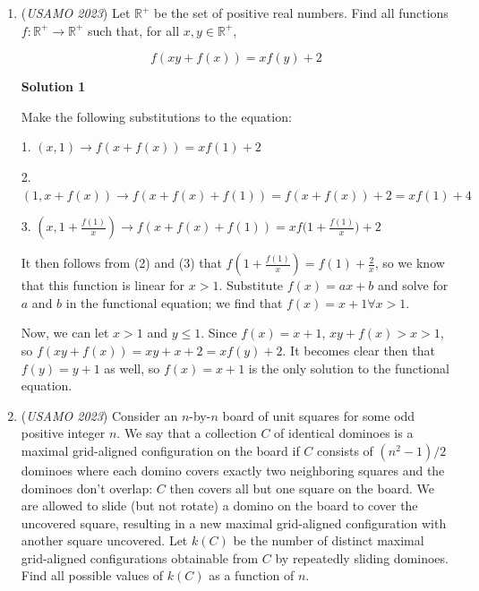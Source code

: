 \begin{enumerate}
\textbf{Solution 3}

Let $X$ be the foot from $A$ to $BC.$ Note that $\angle AXC=\angle APC,$ so $(AXPC)$ is cyclic. Furthermore, $AP$ is the radical axis of $(ABP)$ and $(AXPC),$ so since $M$ lies on $AP,$ we must have that $BM\cdot MQ=CM\cdot MX,$ so $M$ is the midpoint of $QX.$ Therefore, $MN\parallel AX\perp BC,$ so we are done. ~krithikrokcs

 


	\item (\textit{USAMO 2023}) Let $\mathbb{R}^{+}$ be the set of positive real numbers. Find all functions $f:\mathbb{R}^{+}\rightarrow\mathbb{R}^{+}$ such that, for all $x, y \in \mathbb{R}^{+}$,

 \[f(xy + f(x)) = xf(y) + 2\]




\textbf{Solution 1}

Make the following substitutions to the equation:

 1. $(x, 1) \rightarrow f(x + f(x)) = xf(1) + 2$

 2. $(1, x + f(x)) \rightarrow f(x + f(x) + f(1)) = f(x + f(x)) + 2 = xf(1) + 4$

 3. $(x, 1 + \frac{f(1)}{x}) \rightarrow f(x + f(x) + f(1)) = xf\biggl(1 + \frac{f(1)}{x}\biggr) + 2$

 It then follows from (2) and (3) that $f(1 + \frac{f(1)}{x}) = f(1) + \frac{2}{x}$, so we know that this function is linear for $x > 1$. Substitute $f(x) = ax+b$ and solve for $a$ and $b$ in the functional equation; we find that $f(x) = x + 1 \forall x > 1$.

 Now, we can let $x > 1$ and $y \le 1$. Since $f(x) = x + 1$, $xy + f(x) > x > 1$, so $f(xy + f(x)) = xy + x + 2 = xf(y) + 2$. It becomes clear then that $f(y) = y + 1$ as well, so $f(x) = x + 1$ is the only solution to the functional equation.

 


	\item (\textit{USAMO 2023}) Consider an $n$-by-$n$ board of unit squares for some odd positive integer $n$. We say that a collection $C$ of identical dominoes is a maximal grid-aligned configuration on the board if $C$ consists of $(n^2-1)/2$ dominoes where each domino covers exactly two neighboring squares and the dominoes don't overlap: $C$ then covers all but one square on the board. We are allowed to slide (but not rotate) a domino on the board to cover the uncovered square, resulting in a new maximal grid-aligned configuration with another square uncovered. Let $k(C)$ be the number of distinct maximal grid-aligned configurations obtainable from $C$ by repeatedly sliding dominoes. Find all possible values of $k(C)$ as a function of $n$.



\end{enumerate}
